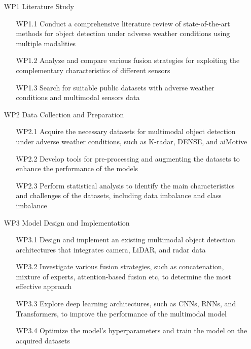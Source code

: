 \documentclass[thesis]{mas_proposal}
\begin{document}
\begin{enumerate}
    
      \item[WP1] Literature Study
      \begin{itemize}
            
            \item[WP1.1] Conduct a comprehensive literature review of state-of-the-art methods for object detection under adverse weather conditions using multiple modalities
            \item[WP1.2] Analyze and compare various fusion strategies for exploiting the complementary characteristics of different sensors 
            \item[WP1.3] Search for suitable public datasets with adverse weather conditions and multimodal sensors data
            
      \end{itemize}


      \item[WP2] Data Collection and Preparation
      \begin{itemize}
            
            \item[WP2.1] Acquire the necessary datasets for multimodal object detection under adverse weather conditions, such as K-radar, DENSE, and aiMotive
            \item[WP2.2] Develop tools for pre-processing and augmenting the datasets to enhance the performance of the models
            \item[WP2.3] Perform statistical analysis to identify the main characteristics and challenges of the datasets, including data imbalance and class imbalance
            
      \end{itemize}

      \item[WP3] Model Design and Implementation
      \begin{itemize}
            
            \item[WP3.1] Design and implement an existing multimodal object detection architectures that integrates camera, LiDAR, and radar data
            \item[WP3.2] Investigate various fusion strategies, such as concatenation, mixture of experts, attention-based fusion etc, to  determine the most effective approach
            \item[WP3.3] Explore deep learning architectures, such as CNNs, RNNs, and Transformers, to improve the performance of the multimodal model
            \item[WP3.4] Optimize the model's hyperparameters and train the model on the acquired datasets
      

\end{itemize}
\end{enumerate}
\end{document}
